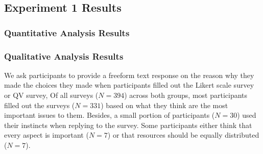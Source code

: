 \subsection{Experiment 1 Results} \label{results-1}
\subsubsection{Quantitative Analysis Results}

    
    
    
    
    
    
\subsubsection{Qualitative Analysis Results}
We ask participants to provide a freeform text response on the reason why they made the choices they made
when participants filled out the Likert scale survey or QV survey,
Of all surveys ($N=394$) across both groups, most participants filled out the surveys ($N=331$) based on what they think are the most important issues to them. %
Besides, a small portion of participants ($N=30$) used their instincts when replying to the survey.
Some participants either think that every aspect is important ($N=7$) or that resources should be equally distributed ($N=7$).

